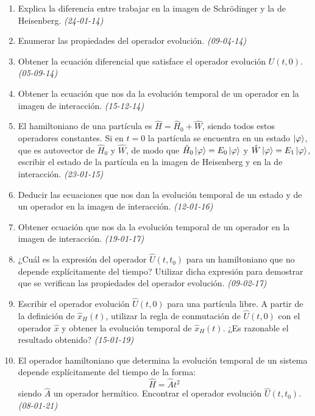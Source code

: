 \begin{enumerate}
    
    \item Explica la diferencia entre trabajar en la imagen de Schrödinger y la de Heisenberg. \textit{(24-01-14)}
    
    \item Enumerar las propiedades del operador evolución. \textit{(09-04-14)}
    
    \item Obtener la ecuación diferencial que satisface el operador evolución $U (t,0)$. \textit{(05-09-14)}
    
    \item Obtener la ecuación que nos da la evolución temporal de un operador en la imagen de interacción. \textit{(15-12-14)}
    
    \item El hamiltoniano de una partícula es $\hat{H} = \hat{H}_0 + \hat{W}$, siendo todos estos operadores constantes. Si en $t = 0$ la partícula se encuentra en un estado $\ket{\varphi}$, que es autovector de $\hat{H}_0$ y $\hat{W}$, de modo que $\hat{H}_0 \ket{\varphi} = E_0 \ket{\varphi}$ y $\hat{W} \ket{\varphi} = E_1 \ket{\varphi}$, escribir el estado de la partícula en la imagen de Heisenberg y en la de interacción. \textit{(23-01-15)}
    
    \item Deducir las ecuaciones que nos dan la evolución temporal de un estado y de un operador en la imagen de interacción. \textit{(12-01-16)}
    
    \item Obtener ecuación que nos da la evolución temporal de un operador en la imagen de interacción. \textit{(19-01-17)}
    
    \item ¿Cuál es la expresión del operador $\hat{U}(t, t_0)$ para un hamiltoniano que no depende explícitamente del tiempo? Utilizar dicha expresión para demostrar que se verifican las propiedades del operador evolución. \textit{(09-02-17)}
    
    \item Escribir el operador evolución $\hat{U}(t, 0)$ para una partícula libre. A partir de la definición de $\hat{x}_H(t)$, utilizar la regla de conmutación de $\hat{U}(t, 0)$ con el operador $\hat{x}$ y obtener la evolución temporal de $\hat{x}_H(t)$. ¿Es razonable el resultado obtenido? \textit{(15-01-19)}
    
    \item El operador hamiltoniano que determina la evolución temporal de un sistema depende explícitamente del tiempo de la forma:
    \[
    \hat{H} = \hat{A} t^2
    \]
    siendo $\hat{A}$ un operador hermítico. Encontrar el operador evolución $\hat{U}(t, t_0)$. \textit{(08-01-21)}


\end{enumerate}
